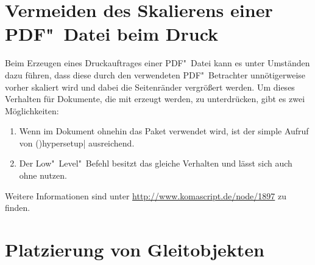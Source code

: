 \section{%
  Vermeiden des Skalierens einer PDF"~Datei beim Druck%
}

%
Beim Erzeugen eines Druckauftrages einer PDF"~Datei kann es unter Umständen 
dazu führen, dass diese durch den verwendeten PDF"~Betrachter unnötigerweise 
vorher skaliert wird und dabei die Seitenränder vergrößert werden. Um dieses 
Verhalten für Dokumente, die mit  erzeugt werden, zu 
unterdrücken, gibt es zwei Möglichkeiten:
%
\begin{enumerate}
\item Wenn im Dokument ohnehin das Paket  verwendet wird, 
  ist der simple Aufruf von
  \Macro(){hypersetup|}
  ausreichend.
\item Der Low"~Level"~Befehl
  besitzt das gleiche Verhalten und lässt sich auch ohne  
  nutzen.
\end{enumerate}
Weitere Informationen sind unter \url{http://www.komascript.de/node/1897} 
zu finden.



\section{%
  Platzierung von Gleitobjekten%
  \label{sec:tips:floats}%
}

